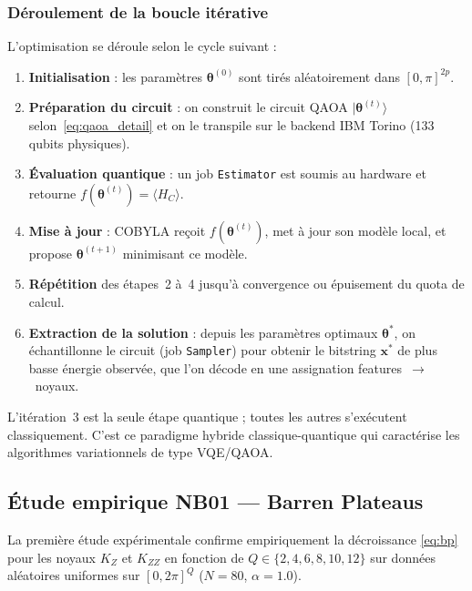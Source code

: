 \documentclass[12pt,a4paper]{article}
\begin{document}
\subsubsection{Déroulement de la boucle itérative}

L'optimisation se déroule selon le cycle suivant :

\begin{enumerate}
  \item \textbf{Initialisation} : les paramètres $\bm{\theta}^{(0)}$ sont
    tirés aléatoirement dans $[0,\pi]^{2p}$.
  \item \textbf{Préparation du circuit} : on construit le circuit QAOA
    $|\bm{\theta}^{(t)}\rangle$ selon~\eqref{eq:qaoa_detail} et on le transpile
    sur le backend IBM Torino (133 qubits physiques).
  \item \textbf{Évaluation quantique} : un job \texttt{Estimator} est soumis au
    hardware et retourne $f(\bm{\theta}^{(t)}) = \langle H_C\rangle$.
  \item \textbf{Mise à jour} : COBYLA reçoit $f(\bm{\theta}^{(t)})$, met à jour
    son modèle local, et propose $\bm{\theta}^{(t+1)}$ minimisant ce modèle.
  \item \textbf{Répétition} des étapes~2 à~4 jusqu'à convergence ou épuisement
    du quota de calcul.
  \item \textbf{Extraction de la solution} : depuis les paramètres optimaux
    $\bm{\theta}^*$, on échantillonne le circuit (job \texttt{Sampler}) pour
    obtenir le bitstring $\bm{x}^*$ de plus basse énergie observée, que l'on
    décode en une assignation features~$\to$~noyaux.
\end{enumerate}

L'itération~3 est la seule étape quantique ; toutes les autres s'exécutent
classiquement.
C'est ce paradigme hybride classique-quantique qui caractérise les algorithmes
variationnels de type VQE/QAOA.

\subsection{Étude empirique NB01 — Barren Plateaus}
\label{sec:nb01}

La première étude expérimentale confirme empiriquement la décroissance
\eqref{eq:bp} pour les noyaux $K_Z$ et $K_{ZZ}$ en fonction de
$Q \in \{2, 4, 6, 8, 10, 12\}$ sur données aléatoires uniformes sur
$[0, 2\pi]^Q$ ($N=80$, $\alpha=1.0$).
\end{document}

